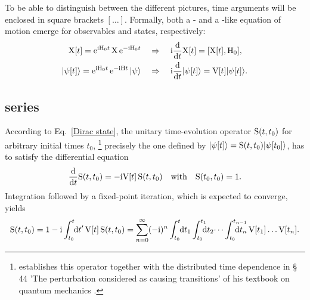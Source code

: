 To be able to distinguish between the different pictures, time arguments will be
enclosed in square brackets $[\dots]$. Formally, both a - and a
-like equation of motion emerge for observables and states,
respectively:
%
\begin{subequations}
    \begin{align}
        \label{Dirac operator}
        \mathrm X[t] = \mathrm e^{\mathrm i \mathrm H_0 t} \, \mathrm X \, \mathrm e^{-\mathrm i \mathrm H_0 t}
        \quad &\Rightarrow \quad
        \mathrm i \frac {\mathrm d} {\mathrm d t} \mathrm X[t] = [\mathrm X[t], \mathrm H_0],
        \\
        \label{Dirac state}
        |\psi[t]\rangle = \mathrm e^{\mathrm i \mathrm H_0 t} \, \mathrm e^{-\mathrm i \mathrm H t} \, |\psi\rangle
        \quad &\Rightarrow \quad
        \mathrm i \frac {\mathrm d} {\mathrm d t} |\psi[t]\rangle = \mathrm V[t] |\psi[t]\rangle.
    \end{align}
\end{subequations}

\subsection{ series}

According to Eq.~\ref{Dirac state}, the unitary time-evolution operator $\mathrm
S(t, t_0)$ for arbitrary initial times $t_0$,%
%
\footnote{ establishes this operator together with the distributed
time dependence in §\,44 \q'The perturbation considered as causing transitions'
of his textbook on quantum mechanics \cite{Dirac}.}
%
precisely the one defined by $|\psi[t]\rangle = \mathrm S(t, t_0) |\psi[t_0]\rangle$,
has to satisfy the differential equation
%
\begin{equation*}
    \frac {\mathrm d} {\mathrm d t} \mathrm S(t, t_0) = -\mathrm i \mathrm V[t] \, \mathrm S(t, t_0)
    \quad \text{with} \quad
    \mathrm S(t_0, t_0) = 1.
\end{equation*}
%
Integration followed by a fixed-point iteration, which is expected to converge,
yields
%
\begin{equation*}
    \op S(t, t_0) = 1 - \I \int \from{t_0} \till t \D t' \,
    \op V[t] \, \op S(t, t_0) =
    \sum_{n = 0}^\infty (-\I)^n
    \int \from{t_0} \till t \D t_1
    \int \from{t_0} \till{t_1} \D t_2 \dots
    \int \from{t_0} \till{t_{n - 1}} \D t_n \,
    \op V[t_1] \dots \op V[t_n].
\end{equation*}

